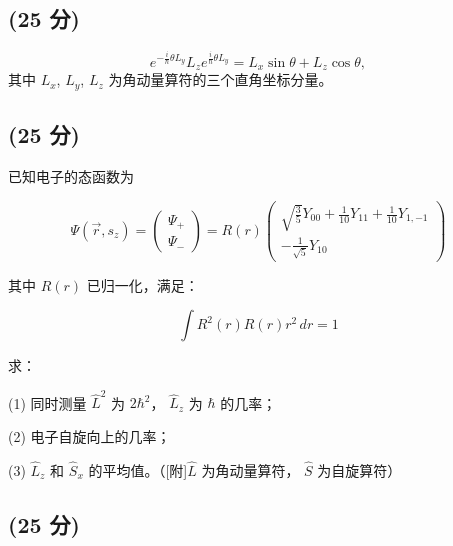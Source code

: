 \subsection{(25 分)}
\[    e^{-\frac{i}{\hbar}\theta L_y} L_z e^{\frac{i}{\hbar}\theta L_y} = L_x \sin\theta + L_z \cos\theta, ~\]
    其中 $L_x$, $L_y$, $L_z$ 为角动量算符的三个直角坐标分量。
\subsection{(25 分)}

已知电子的态函数为

\[
\Psi(\vec{r}, s_z) = \begin{pmatrix} \Psi_+ \\ \Psi_- \end{pmatrix} = R(r) \begin{pmatrix} \sqrt{\frac{3}{5}} Y_{00} + \frac{1}{10} Y_{11} + \frac{1}{10} Y_{1,-1} \\ -\frac{1}{\sqrt{5}} Y_{10} \end{pmatrix}~
\]

其中 \( R(r) \) 已归一化，满足：

\[
\int R^2(r) R(r) r^2 \, dr = 1~
\]

求：

(1) 同时测量 \( \hat{L}^2 \) 为 \( 2\hbar^2 \)， \( \hat{L}_z \) 为 \( \hbar \)  的几率；  

(2) 电子自旋向上的几率；  

(3) \( \hat{L}_z \) 和 \( \hat{S}_x \) 的平均值。（[附]\( \hat{L} \) 为角动量算符， \( \hat{S} \) 为自旋算符）
\subsection{(25 分)}
